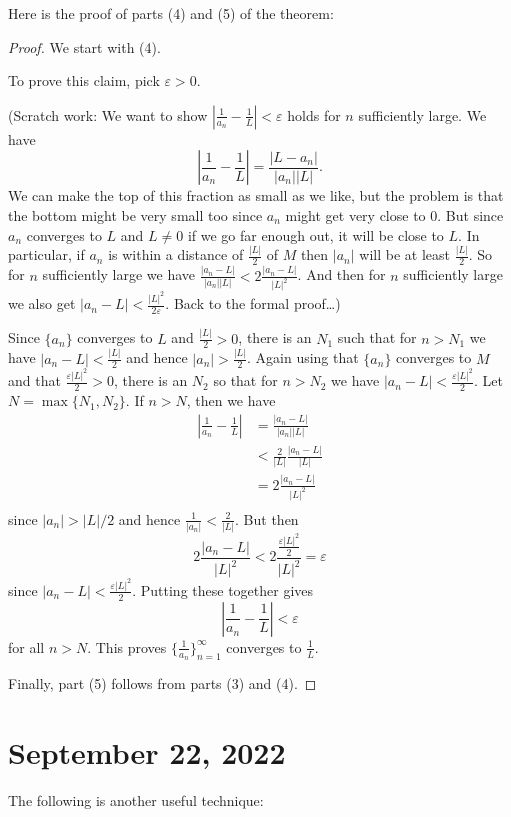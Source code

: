 \documentclass[12pt]{amsart}
\def\e{\varepsilon}
\numberwithin{equation}{section}
\theoremstyle{plain} %
\newcommand{\Sept}[1]{\section{September #1, 2022}}
\theoremstyle{definition}
\theoremstyle{remark}
\begin{document}
Here is the proof of parts (4) and (5) of the theorem:
\begin{proof}
We start with (4).

To prove this claim,  pick $\e > 0$. 
	
	(Scratch work: We want to show $\left|\frac{1}{a_n} -
	\frac{1}{L}\right| < \e$ holds for $n$ sufficiently large.  
	We have
	$$
	\left|\frac{1}{a_n} - \frac{1}{L}\right| = \frac{|L - a_n|}{|a_n||L|}.
	$$ 
	We can make the top of this fraction as small as we like, but the problem is that the
	bottom might be very small too since $a_n$ might get very close to $0$. But since $a_n$ converges to $L$ and $L \ne 0$ if we go far enough out, it will be
	close to $L$. In particular, if $a_n$ is within a distance of
	$\frac{|L|}{2}$ of $M$ then $|a_n|$ will be at least
	$\frac{|L|}{2}$. So for $n$ sufficiently large we have
	$\frac{|a_n-L|}{|a_n||L|} < 2 \frac{|a_n-L|}{|L|^2}$. And then for $n$
	sufficiently large we also get $|a_n - L| < \frac{|L|^2}{2 \e}$.  Back to the formal proof\dots)
	
	
	
	Since $\{a_n\}$ converges to $L$ and $\frac{|L|}{2} > 0$, there is an $N_1$ such that for $n > N_1$ we have $|a_n - L| < \frac{|L|}{2}$  and hence
	$|a_n| > \frac{|L|}{2}$. Again using that $\{a_n\}$ converges to $M$
	and that $\frac{ \e |L|^2}{2} > 0$, there is an $N_2$ so that for $n > N_2$ we have
	$|a_n - L| < \frac{ \e |L|^2}{2}$. Let $N = \max\{N_1, N_2\}$. If $n > N$, then we have
	$$
	\begin{aligned}
	\left|\frac{1}{a_n} - \frac{1}{L}\right| & = \frac{|a_n - L|}{|a_n||L|} \\
	& < \frac{2}{|L|}  \frac{|a_n - L|}{|L|} \\
	& = 2 \frac{|a_n - L|}{|L|^2} \\
	\end{aligned}
	$$
	since $|a_n| > |L|/2$ and hence $\frac{1}{|a_n|} < \frac{2}{|L|}$.
	But then
	$$
	2 \frac{|a_n - L|}{|L|^2}  < 2 \frac{\frac{\e |L|^2}{2}}{|L|^2} = \e
	$$
	since $|a_n - L| < \frac{ \e |L|^2}{2}$. Putting these together gives
	$$
	\left|\frac{1}{a_n} - \frac{1}{L}\right| < \e
	$$
	for all $n > N$. 
	This proves $\{\frac{1}{a_n}\}_{n=1}^\infty$ converges to $\frac{1}{L}$.

Finally, part (5) follows from parts (3) and (4).
\end{proof}


\Sept{22}


The following is another useful technique:
\end{document}
